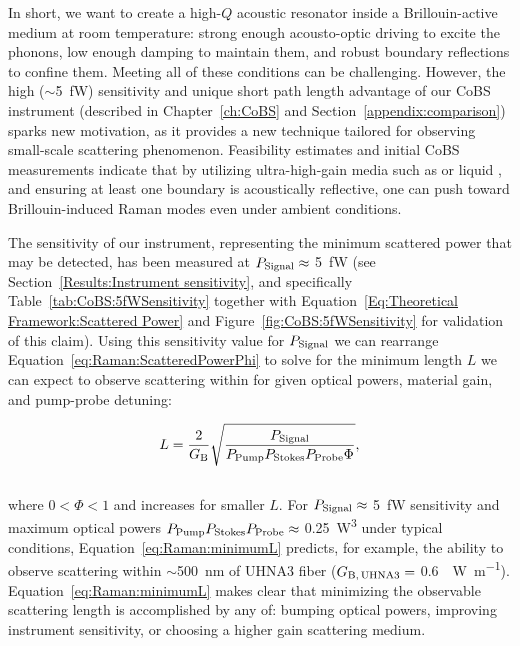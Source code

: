 In short, we want to create a high-\(Q\) acoustic resonator inside a Brillouin-active medium at room temperature: strong enough acousto-optic driving to excite the phonons, low enough damping to maintain them, and robust boundary reflections to confine them. Meeting all of these conditions can be challenging. However, the high (\(\sim\)\SI{5}{\femto\watt}) sensitivity and unique short path length advantage of our \ac{CoBS} instrument (described in Chapter~\ref{ch:CoBS} and Section~\ref{appendix:comparison}) sparks new motivation, as it provides a new technique tailored for observing small-scale scattering phenomenon. Feasibility estimates and initial \ac{CoBS} measurements indicate that by utilizing ultra-high-gain media such as  \cite{sanghera2010nonlinear, abedin2005observation} or liquid  \cite{boyd2020nonlinear}, and ensuring at least one boundary is acoustically reflective, one can push toward Brillouin-induced Raman modes even under ambient conditions.

The sensitivity of our instrument, representing the minimum scattered power that may be detected, has been measured at \(P_{\rm Signal}\approx\) \SI{5}{\femto\watt} (see Section~\ref{Results:Instrument sensitivity}, and specifically Table~\ref{tab:CoBS:5fWSensitivity} together with Equation~\ref{Eq:Theoretical Framework:Scattered Power} and Figure~\ref{fig:CoBS:5fWSensitivity} for validation of this claim). Using this sensitivity value for \(P_{\rm Signal}\) we can rearrange Equation~\ref{eq:Raman:ScatteredPowerPhi} to solve for the minimum length \(L\) we can expect to observe scattering within for given optical powers, material gain, and pump-probe detuning:

\begin{equation}
  L = \frac{2}{G_{\rm B}}\sqrt{\frac{P_{\rm Signal}}{P_{\rm Pump}P_{\rm Stokes}P_{\rm Probe}\Phi}},
  \label{eq:Raman:minimumL}
\end{equation}
\\
where \(0 < \Phi < 1\) and increases for smaller \(L\). For \(P_{\rm Signal}\approx\) \SI{5}{\femto\watt} sensitivity and maximum optical powers \(P_{\rm Pump}P_{\rm Stokes}P_{\rm Probe}\approx\) \SI{0.25}{\cubic\watt} under typical conditions, Equation~\ref{eq:Raman:minimumL} predicts, for example, the ability to observe scattering within \(\sim\)\SI{500}{\nano\meter} of \ac{UHNA3} fiber (\(G_{\rm B,\,UHNA3}=\) \SI{0.6}{\per\watt\per\meter}). Equation~\ref{eq:Raman:minimumL} makes clear that minimizing the observable scattering length is accomplished by any of: bumping optical powers, improving instrument sensitivity, or choosing a higher gain scattering medium.

